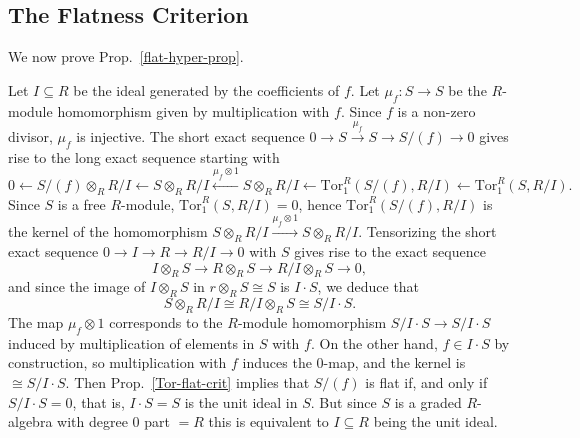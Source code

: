 \documentclass{amsart}
\theoremstyle{plain}
\numberwithin{equation}{section} %
\numberwithin{figure}{section} %
\theoremstyle{plain}
\theoremstyle{plain}
\theoremstyle{plain}
\theoremstyle{plain}
\theoremstyle{plain}
\theoremstyle{plain}
\theoremstyle{remark}
\theoremstyle{remark}
\theoremstyle{remark}
\begin{document}
\subsection{The Flatness Criterion}

We now prove Prop.~\ref{flat-hyper-prop}.

Let $I \subseteq R$ be the ideal generated by the coefficients of $f$. Let $\mu_f : S \rightarrow S$ be the $R$-module homomorphism given by multiplication with $f$. Since $f$ is a non-zero divisor, $\mu_f$ is injective. The short exact sequence $0 \rightarrow S \stackrel{\mu_f}{\longrightarrow} S \rightarrow S/(f) \rightarrow 0$ gives rise to the long exact sequence starting with 
\[ 0 \leftarrow S/(f) \otimes_R R/I \leftarrow S \otimes_R R/I \stackrel{\mu_f \otimes 1}{\longleftarrow} 
   S \otimes_R R/I  \leftarrow \mathrm{Tor}_1^R(S/(f), R/I) \leftarrow \mathrm{Tor}_1^R(S, R/I). \]
Since $S$ is a free $R$-module, $\mathrm{Tor}_1^R(S, R/I) = 0$, hence $\mathrm{Tor}_1^R(S/(f), R/I)$ is the kernel of the homomorphism $ S \otimes_R R/I \stackrel{\mu_f \otimes 1}{\longrightarrow} 
   S \otimes_R R/I$. Tensorizing the short exact sequence $0 \rightarrow I \rightarrow R \rightarrow R/I \rightarrow 0$ with $S$ gives rise to the exact sequence
\[ I \otimes_R S \rightarrow R \otimes_R S \rightarrow R/I \otimes_R S \rightarrow 0, \]
and since the image of $I \otimes_R S$ in $r \otimes_R S \cong S$ is $I \cdot S$, we deduce that 
\[ S \otimes_R R/I \cong R/I \otimes_R S \cong S/I \cdot S. \]
The map $\mu_f \otimes 1$ corresponds to the $R$-module homomorphism $S/I \cdot S \rightarrow S/I \cdot S$ induced by multiplication of elements in $S$ with $f$. On the other hand, $f \in I \cdot S$ by construction, so multiplication with $f$ induces the $0$-map, and the kernel is $\cong S/I \cdot S$. Then Prop.~\ref{Tor-flat-crit} implies that $S/(f)$ is flat if, and only if $S/I \cdot S = 0$, that is, $I \cdot S = S$ is the unit ideal in $S$. But since $S$ is a graded $R$-algebra with degree $0$ part $= R$ this is equivalent to $I \subseteq R$ being the unit ideal.  





\end{document}
